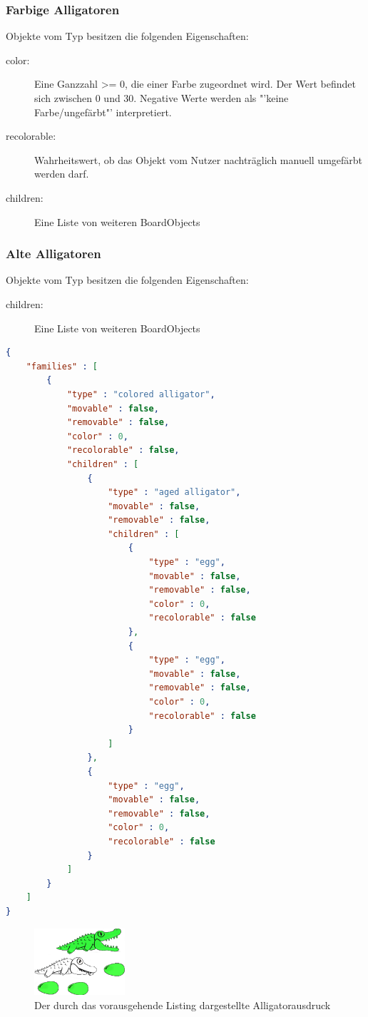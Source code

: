 \subsubsection{Farbige Alligatoren}
Objekte vom Typ  besitzen die folgenden Eigenschaften:
\begin{description}
	\item[color:] Eine Ganzzahl >= 0, die einer Farbe zugeordnet wird. Der Wert befindet sich zwischen 0 und 30. Negative Werte werden als "'keine Farbe/ungefärbt"' interpretiert.
	\item[recolorable:] Wahrheitswert, ob das Objekt vom Nutzer nachträglich manuell umgefärbt werden darf.
	\item[children:] Eine Liste von weiteren BoardObjects
\end{description}

\subsubsection{Alte Alligatoren}
Objekte vom Typ  besitzen die folgenden Eigenschaften:
\begin{description}
	\item[children:] Eine Liste von weiteren BoardObjects
\end{description}

\begin{lstlisting}[language=json,caption={Ein einfaches Board mit allen existierenden BoardObjects}]
{
	"families" : [
		{
			"type" : "colored alligator",
			"movable" : false,
			"removable" : false,
			"color" : 0,
			"recolorable" : false,
			"children" : [
				{
					"type" : "aged alligator",
					"movable" : false,
					"removable" : false,
					"children" : [
						{
							"type" : "egg",
							"movable" : false,
							"removable" : false,
							"color" : 0,
							"recolorable" : false
						},
						{
							"type" : "egg",
							"movable" : false,
							"removable" : false,
							"color" : 0,
							"recolorable" : false
						}
					]
				},
				{
					"type" : "egg",
					"movable" : false,
					"removable" : false,
					"color" : 0,
					"recolorable" : false
				}
			]
		}
	]
}
\end{lstlisting}
	
\begin{figure}[h]
	\caption{Der durch das vorausgehende Listing dargestellte Alligatorausdruck}
	\begin{center}
		\includegraphics[width=0.3\textwidth]{../assets/lx.((x x) x).png}
	\end{center}
\end{figure}

